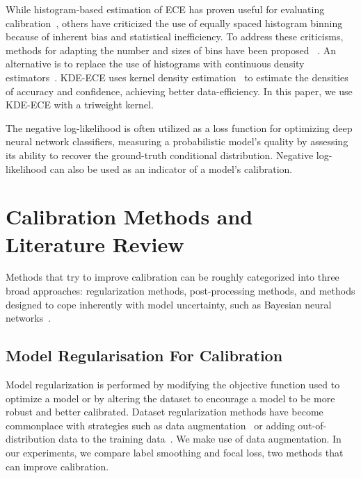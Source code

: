 While histogram-based estimation of ECE has proven useful for evaluating calibration~\citep{muller2019does}, others have criticized the use of equally spaced histogram binning because of inherent bias and statistical inefficiency. To address these criticisms, methods for adapting the number and sizes of bins have been proposed ~\citep{roelofs2022mitigating}. An alternative is to replace the use of histograms with continuous density estimators~\citep{zhang2020mix}. KDE-ECE uses kernel density estimation~\citep{parzen1962estimation} to estimate the densities of accuracy and confidence, achieving better data-efficiency. In this paper, we use KDE-ECE with a triweight kernel.

The negative log-likelihood is often utilized as a loss function for optimizing deep neural network classifiers, measuring a probabilistic model's quality by assessing its ability to recover the ground-truth conditional distribution. Negative log-likelihood can also be used as an indicator of a model's calibration.



\section{Calibration Methods and Literature Review}
\label{sec:calibration_review}
Methods that try to improve calibration can be roughly categorized into three broad approaches: regularization methods, post-processing methods, and methods designed to cope inherently with model uncertainty, such as Bayesian neural networks~\citep{gawlikowski2021survey}.


\subsection{Model Regularisation For Calibration}
Model regularization is performed by modifying the objective function used to optimize a model or by altering the dataset to encourage a model to be more robust and better calibrated. Dataset regularization methods have become commonplace with strategies such as data augmentation~\citep{hendrycks2019augmix} or adding out-of-distribution data to the training data~\citep{hendrycks2018deep}. We make use of data augmentation. In our experiments, we compare label smoothing and focal loss, two methods that can improve calibration.

